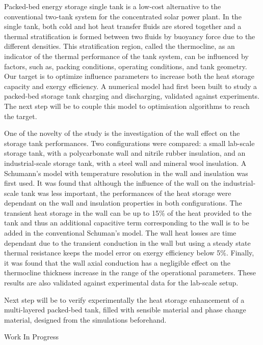 {\normalsize
Packed-bed energy storage single tank is a low-cost alternative to the conventional two-tank system for the concentrated solar power plant. In the single tank, both cold and hot heat transfer fluids are stored together and a thermal stratification is formed between two fluids by buoyancy force due to the different densities. This stratification region, called the thermocline, as an indicator of the thermal performance of the tank system, can be influenced by factors, such as, packing conditions, operating conditions, and tank geometry. Our target is to optimize influence parameters to increase both the heat storage capacity and exergy efficiency. A numerical model had first been built to study a packed-bed storage tank charging and discharging, validated against experiments. The next step will be to couple this model to optimisation algorithms to reach the target.







One of the novelty of the study is the investigation of the wall effect on the storage tank performances. Two configurations were compared: a small lab-scale storage tank, with a polycarbonate wall and nitrile rubber insulation, and an industrial-scale storage tank, with a steel wall and mineral wool insulation. A Schumann's model with temperature resolution in the wall and insulation was first used. It was found that although the influence of the wall on the industrial-scale tank was less important, the performances of the heat storage were dependant on the wall and insulation properties in both configurations. The transient heat storage in the wall can be up to 15\% of the heat provided to the tank and thus an additional capacitive term corresponding to the wall is to be added in the conventional Schuman's model. The wall heat losses are time dependant due to the transient conduction in the wall but using a steady state thermal resistance keeps the model error on exergy efficiency below 5\%. Finally, it was found that the wall axial conduction has a negligible effect on the thermocline thickness increase in the range of the operational parameters. These results are also validated against experimental data for the lab-scale setup.







Next step will be to verify experimentally the heat storage enhancement of a multi-layered packed-bed tank, filled with sensible material and phase change material, designed from the simulations beforehand.

 \vfill Work In Progress

}
 
